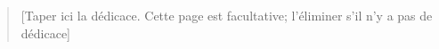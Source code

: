 \thispagestyle{empty}

\begin{minipage}[l]{0.45\textwidth}

\end{minipage}%
\hfill
\begin{minipage}[r]{0.5\textwidth}
\begin{quotation}
\begin{doublespace}

[Taper ici la dédicace. Cette page est facultative; l’éliminer s’il n’y a pas de dédicace]

\end{doublespace}
\end{quotation}
\end{minipage}%

\cleardoublepage